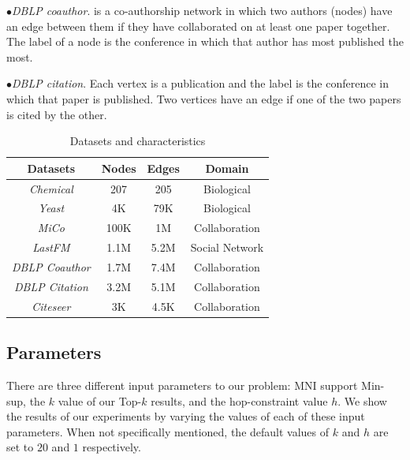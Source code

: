 $\bullet${\textit{DBLP coauthor}\cite{}}. is a co-authorship network in which two authors (nodes) have an edge between them if they have collaborated on at least one paper together. The label of a node is the conference in which that author has most published the most.%

$\bullet${\textit{DBLP citation}\cite{}}. Each vertex is a publication and the label is the conference in which that paper is published. Two vertices have an edge if one of the two papers is cited by the other. %
\begin{table}[tb!]
	\vspace{-2mm}
		\vspace{-1mm}
		\centering
		\caption{Datasets and characteristics\label{tab:datasets}}
		\vspace{-3mm}
{\scriptsize
		\begin{tabular} {cccc}
			\hline
			Datasets  & Nodes & Edges  & Domain\\			 
			\hline 
			{\em Chemical}   &   207    &  205   & Biological\\
			{\em Yeast}   &   4K    &  79K  & Biological\\
			{\em MiCo}   &   100K    &  1M   & Collaboration\\ 
			{\em LastFM}   &   1.1M   &  5.2M & Social Network\\
			{\em DBLP Coauthor}   &   1.7M    &  7.4M   & Collaboration\\ 
			{\em DBLP Citation}   &   3.2M   &  5.1M   & Collaboration\\
			{\em Citeseer}   &   3K   &  4.5K & Collaboration\\
			
			\hline
		\end{tabular}}
	\vspace{-4mm}
\end{table}


\subsection{Parameters} There are three different input parameters to our problem: MNI support {\sf Min-sup}, the $k$ value of our {\sf Top-$k$} results, and the hop-constraint value $h$. We show the results of our experiments by varying the values of each of these input parameters. When not specifically mentioned, the default values of $k$ and $h$ are set to $20$ and $1$ respectively. %

